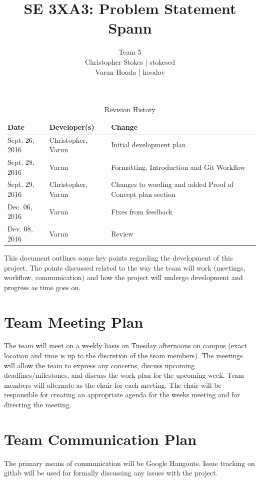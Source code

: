 \documentclass{article}
\title{SE 3XA3: Problem Statement\\Spann}
\author{Team 5
		\\ Christopher Stokes | stokescd
		\\ Varun Hooda | hoodav
}
\date{}
\begin{document}
\begin{table}[hp]
\caption{Revision History} \label{TblRevisionHistory}
\begin{tabularx}{\textwidth}{llX}
\toprule
\textbf{Date} & \textbf{Developer(s)} & \textbf{Change}\\
\midrule
    Sept. 26, 2016 & Christopher, Varun & Initial development plan\\
    Sept. 28, 2016 & Varun & Formatting, Introduction and Git Workflow\\
    Sept. 29, 2016 & Christopher, Varun & Changes to wording and added Proof of
    Concept plan section\\
    Dec. 06, 2016 & Varun & Fixes from feedback\\
    Dev. 08, 2016 & Varun & Review\\
\bottomrule
\end{tabularx}
\end{table}

\newpage

\maketitle

This document outlines some key points regarding the development of this
project. The points discussed related to the way the team will work (meetings,
workflow, communication) and how the project will undergo development and
progress as time goes on.

\section{Team Meeting Plan}
The team will meet on a weekly basis on Tuesday afternoons on campus (exact
location and time is up to the discretion of the team members). The meetings
will allow the team to express any concerns, discuss upcoming
deadlines/milestones, and discuss the work plan for the upcoming week. Team
members will alternate as the chair for each meeting. The chair will be
responsible for creating an appropriate agenda for the weeks meeting and for
directing the meeting.

\section{Team Communication Plan}
The primary means of communication will be Google Hangouts. Issue tracking on
gitlab will be used for formally discussing any issues with the project.
\end{document}
